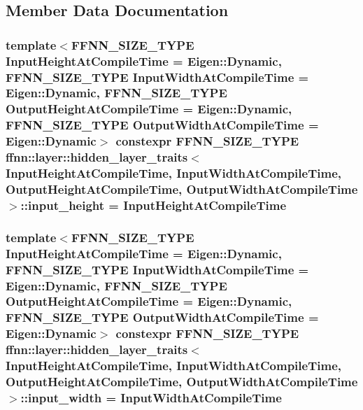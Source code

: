 \subsection{Member Data Documentation}
\hypertarget{structffnn_1_1layer_1_1hidden__layer__traits_a9c859f99e696cfbf5900126b950c3111}{
\subsubsection[{input\-\_\-height}]{\setlength{\rightskip}{0pt plus 5cm}template$<$F\-F\-N\-N\-\_\-\-S\-I\-Z\-E\-\_\-\-T\-Y\-P\-E Input\-Height\-At\-Compile\-Time = Eigen\-::\-Dynamic, F\-F\-N\-N\-\_\-\-S\-I\-Z\-E\-\_\-\-T\-Y\-P\-E Input\-Width\-At\-Compile\-Time = Eigen\-::\-Dynamic, F\-F\-N\-N\-\_\-\-S\-I\-Z\-E\-\_\-\-T\-Y\-P\-E Output\-Height\-At\-Compile\-Time = Eigen\-::\-Dynamic, F\-F\-N\-N\-\_\-\-S\-I\-Z\-E\-\_\-\-T\-Y\-P\-E Output\-Width\-At\-Compile\-Time = Eigen\-::\-Dynamic$>$ constexpr {\bf F\-F\-N\-N\-\_\-\-S\-I\-Z\-E\-\_\-\-T\-Y\-P\-E} {\bf ffnn\-::layer\-::hidden\-\_\-layer\-\_\-traits}$<$ Input\-Height\-At\-Compile\-Time, Input\-Width\-At\-Compile\-Time, Output\-Height\-At\-Compile\-Time, Output\-Width\-At\-Compile\-Time $>$\-::input\-\_\-height = Input\-Height\-At\-Compile\-Time\hspace{0.3cm}{\ttfamily [static]}}}\label{structffnn_1_1layer_1_1hidden__layer__traits_a9c859f99e696cfbf5900126b950c3111}
\hypertarget{structffnn_1_1layer_1_1hidden__layer__traits_a4bf1eef4840757fb958c44e5e56b7e46}{
\subsubsection[{input\-\_\-width}]{\setlength{\rightskip}{0pt plus 5cm}template$<$F\-F\-N\-N\-\_\-\-S\-I\-Z\-E\-\_\-\-T\-Y\-P\-E Input\-Height\-At\-Compile\-Time = Eigen\-::\-Dynamic, F\-F\-N\-N\-\_\-\-S\-I\-Z\-E\-\_\-\-T\-Y\-P\-E Input\-Width\-At\-Compile\-Time = Eigen\-::\-Dynamic, F\-F\-N\-N\-\_\-\-S\-I\-Z\-E\-\_\-\-T\-Y\-P\-E Output\-Height\-At\-Compile\-Time = Eigen\-::\-Dynamic, F\-F\-N\-N\-\_\-\-S\-I\-Z\-E\-\_\-\-T\-Y\-P\-E Output\-Width\-At\-Compile\-Time = Eigen\-::\-Dynamic$>$ constexpr {\bf F\-F\-N\-N\-\_\-\-S\-I\-Z\-E\-\_\-\-T\-Y\-P\-E} {\bf ffnn\-::layer\-::hidden\-\_\-layer\-\_\-traits}$<$ Input\-Height\-At\-Compile\-Time, Input\-Width\-At\-Compile\-Time, Output\-Height\-At\-Compile\-Time, Output\-Width\-At\-Compile\-Time $>$\-::input\-\_\-width = Input\-Width\-At\-Compile\-Time\hspace{0.3cm}{\ttfamily [static]}}}\label{structffnn_1_1layer_1_1hidden__layer__traits_a4bf1eef4840757fb958c44e5e56b7e46}
